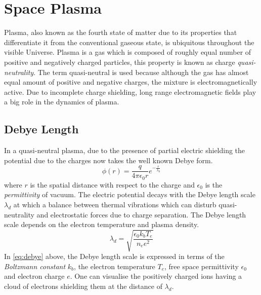 \section{Space Plasma}\label{sec:plasma}

Plasma, also known as the fourth state of matter due to its properties that differentiate it 
from the conventional gaseous state, is ubiquitous throughout the visible Universe. Plasma is a gas 
which is composed of roughly equal number of positive and negatively charged particles, this property is known as charge \emph{quasi-neutrality}. The term quasi-neutral is used because although the gas has almost equal amount of positive and negative charges, the mixture is electromagnetically active. Due to incomplete charge shielding, long range electromagnetic fields 
play a big role in the dynamics of plasma.




\subsection*{Debye Length}

In a quasi-neutral plasma, due to the presence of partial electric shielding the potential due to 
the charges now takes the well known Debye form.
%
\begin{equation}
    \phi(r) = \frac{q}{4\pi\epsilon_0 r} e^{-\frac{r}{\lambda_d}}
\end{equation}
%
where $r$ is the spatial distance with respect to the charge and $\epsilon_0$ is the 
\emph{permittivity} of vacuum. The electric potential decays with the Debye length scale 
$\lambda_d$ at which a balance between thermal vibrations which can disturb quasi-neutrality and 
electrostatic forces due to charge separation. The Debye length scale depends on the electron 
temperature and plasma density.
%
\begin{equation}\label{eq:debye}
    \lambda_d = \sqrt{\frac{\epsilon_0 k_b T_e}{n_e e^2}}
\end{equation}
%
In \cref{eq:debye} above, the Debye length scale is expressed in terms of the 
\emph{Boltzmann constant} $k_b$, the electron temperature $T_e$, free space permittivity 
$\epsilon_0$ and electron charge $e$. One can visualise the positively charged ions having a cloud 
of electrons shielding them at the distance of $\lambda_d$. 

